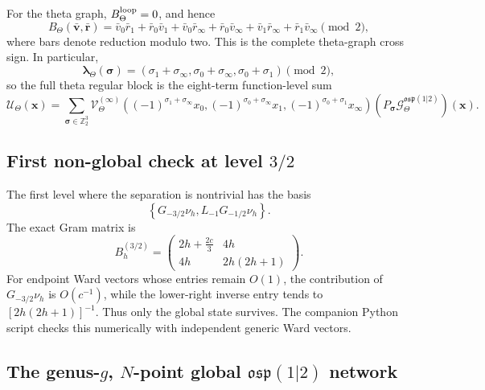 \documentclass[11pt]{article}
\newcommand{\osp}{\mathfrak{osp}(1|2)}
\newcommand{\G}{\mathcal G}
\newcommand{\V}{\mathcal V}
\newcommand{\U}{\mathcal U}
\begin{document}
For the theta graph, \(B_\Theta^{\rm loop}=0\), and hence
\begin{equation}
 B_\Theta(\bar{\bm v},\bar{\bm r})
 =\bar v_0\bar r_1+\bar r_0\bar v_1
  +\bar v_0\bar r_\infty+\bar r_0\bar v_\infty
  +\bar v_1\bar r_\infty+\bar r_1\bar v_\infty
  \pmod2,
 \label{eq:theta-polarized-sign}
\end{equation}
where bars denote reduction modulo two.  This is the complete theta-graph
cross sign.  In particular,
\begin{equation}
 \bm\lambda_\Theta(\bm\sigma)
 =(\sigma_1+\sigma_\infty,
   \sigma_0+\sigma_\infty,
   \sigma_0+\sigma_1)\pmod2,
 \label{eq:theta-sign-flip-vector}
\end{equation}
so the full theta regular block is the eight-term function-level sum
\begin{equation}
 \U_\Theta(\bm x)
 =\sum_{\bm\sigma\in\mathbb Z_2^3}
 \V_\Theta^{(\infty)}
 \left((-1)^{\sigma_1+\sigma_\infty}x_0,
       (-1)^{\sigma_0+\sigma_\infty}x_1,
       (-1)^{\sigma_0+\sigma_1}x_\infty\right)
 (P_{\bm\sigma}\G_\Theta^{\osp})(\bm x).
 \label{eq:theta-regular-parity-resummed}
\end{equation}

\subsection{\texorpdfstring{First non-global check at level \(3/2\)}
{First non-global check at level 3/2}}

The first level where the separation is nontrivial has the basis
\begin{equation}
 \left\{
  G_{-3/2}\nu_h,
  L_{-1}G_{-1/2}\nu_h
 \right\}.
 \label{eq:level-three-half-basis}
\end{equation}
The exact Gram matrix is
\begin{equation}
 B_h^{(3/2)}=
 \begin{pmatrix}
  2h+\frac{2c}{3}&4h\\
  4h&2h(2h+1)
 \end{pmatrix}.
 \label{eq:level-three-half-gram}
\end{equation}
For endpoint Ward vectors whose entries remain \(O(1)\), the contribution
of \(G_{-3/2}\nu_h\) is \(O(c^{-1})\), while the lower-right inverse entry
tends to \([2h(2h+1)]^{-1}\).  Thus only the global state survives.  The
companion Python script checks this numerically with independent generic Ward
vectors.

\subsection{\texorpdfstring{The genus-\(g\), \(N\)-point global \(\osp\) network}
{The genus-g, N-point global osp(1|2) network}}
\label{sec:global-network}
\end{document}
